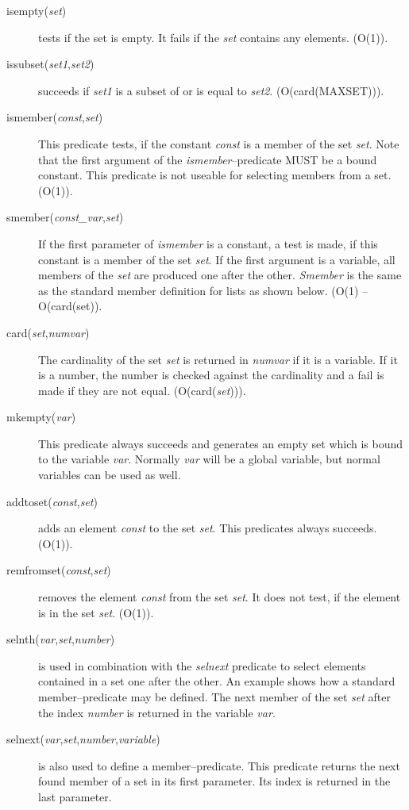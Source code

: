 \begin{description}
\item[isempty({\it set\/})]
tests if the set is empty. It fails if the {\it set\/} contains
any elements. (O(1)).
\item[issubset({\it set1\/},{\it set2\/})]
succeeds if {\it set1\/} is a subset of or is equal to {\it set2\/}.
(O(card(MAXSET))).
\item[ismember({\it const\/},{\it set\/})]
This predicate tests, if the constant {\it const\/} is a member
of the set {\it set\/}. Note that the first argument of the
{\it ismember}--predicate MUST be a bound constant. This predicate is not
useable for selecting members from a set. (O(1)).
\item[smember({\it const\_var\/},{\it set\/})]
If the first parameter of {\it ismember\/} is a constant, a test is made,
if this constant is a member of the set {\it set\/}.
If the first argument is a variable, all members of the {\it set\/} are
produced one after the other. {\it Smember\/} is the same as the standard
member definition for lists as shown below. (O(1) -- O(card(set)).
\item[card({\it set\/},{\it numvar\/})]
The cardinality of the set {\it set\/} is returned in {\it numvar\/} 
if it is a variable. If it is a number, the number is checked against
the cardinality and a fail is made if they are not equal.
(O(card({\it set\/}))).
\item[mkempty({\it var\/})]
This predicate always succeeds and generates an empty set which
is bound to the variable {\it var\/}. Normally {\it var\/} will be a
global variable, but normal variables can be used as well.
\item[addtoset({\it const\/},{\it set\/})]
adds an element {\it const\/} to the set {\it set\/}. This predicates
always succeeds. (O(1)).
\item[remfromset({\it const\/},{\it set\/})]
removes the element {\it const\/} from the set {\it set\/}.
It does not test, if the element is in the set {\it set\/}.
(O(1)).
\item[selnth({\it var\/},{\it set\/},{\it number\/})]
is used in combination with the {\it selnext\/} predicate to
select elements contained in a set one after the other.
An example shows how a standard member--predicate may be defined.
The next member of the set {\it set\/} after the index {\it number\/}
is returned in the variable {\it var\/}.
\item[selnext({\it var\/},{\it set\/},{\it number\/},{\it variable\/})]
is also used to define a member--predicate.
This predicate returns the next found member of a set in its first parameter.
Its index is returned in the last parameter.
\end{description}

